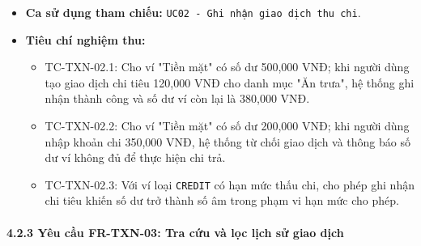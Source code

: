 \documentclass[11pt,a4paper]{article}
\providecommand{\tightlist}{
  \setlength{\itemsep}{0pt}\setlength{\parskip}{0pt}}
\begin{document}
\begin{itemize}
  \begin{itemize}
  \tightlist
  \item
    Bản ghi giao dịch chi tiêu mới được lưu thành công kèm mã
    \texttt{txnId}.
  \item
    Số dư của ví chi tiền giảm đúng bằng số tiền chi tiêu.
  \item
    Thông báo ghi nhận giao dịch chi tiêu thành công.
  \end{itemize}
\item
  \textbf{Ca sử dụng tham chiếu:}
  \texttt{UC02\ -\ Ghi\ nhận\ giao\ dịch\ thu\ chi}.
\item
  \textbf{Tiêu chí nghiệm thu:}

  \begin{itemize}
  \tightlist
  \item
    TC-TXN-02.1: Cho ví "Tiền mặt" có số dư 500,000 VNĐ; khi người dùng
    tạo giao dịch chi tiêu 120,000 VNĐ cho danh mục "Ăn trưa", hệ thống
    ghi nhận thành công và số dư ví còn lại là 380,000 VNĐ.
  \item
    TC-TXN-02.2: Cho ví "Tiền mặt" có số dư 200,000 VNĐ; khi người dùng
    nhập khoản chi 350,000 VNĐ, hệ thống từ chối giao dịch và thông báo
    số dư ví không đủ để thực hiện chi trả.
  \item
    TC-TXN-02.3: Với ví loại \texttt{CREDIT} có hạn mức thấu chi, cho
    phép ghi nhận chi tiêu khiến số dư trở thành số âm trong phạm vi hạn
    mức cho phép.
  \end{itemize}
\end{itemize}

\newpage

\paragraph{4.2.3 Yêu cầu FR-TXN-03: Tra cứu và lọc lịch sử giao
dịch}\label{423-yuxeau-cux1ea7u-fr-txn-03-tra-cux1ee9u-vuxe0-lux1ecdc-lux1ecbch-sux1eed-giao-dux1ecbch}
\end{document}
